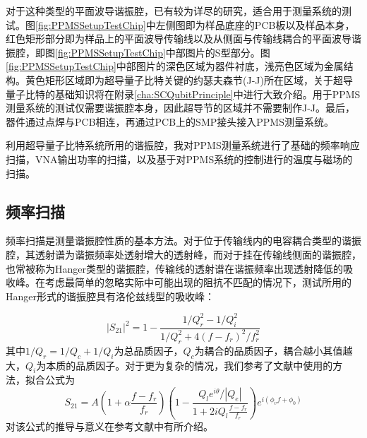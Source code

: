                   对于这种类型的平面波导谐振腔，已有较为详尽的研究\cite{Day2003,Wallraff2004Nature,schuster2007circuit,Gao2008Thesis,Barends2010APL,Geerlings2013}，适合用于测量系统的测试。图\ref{fig:PPMSSetupTestChip}中左侧图即为样品底座的PCB板以及样品本身，红色矩形部分即为样品上的平面波导传输线以及从侧面与传输线耦合的平面波导谐振腔，即图\ref{fig:PPMSSetupTestChip}中部图片的S型部分。图\ref{fig:PPMSSetupTestChip}中部图片的深色区域为器件衬底，浅亮色区域为金属结构。黄色矩形区域即为超导量子比特关键的约瑟夫森节(J-J)所在区域，关于超导量子比特的基础知识将在附录\ref{cha:SCQubitPrinciple}中进行大致介绍。用于PPMS测量系统的测试仅需要谐振腔本身，因此超导节的区域并不需要制作J-J。最后，器件通过点焊与PCB相连，再通过PCB上的SMP接头接入PPMS测量系统。

                  利用超导量子比特系统所用的谐振腔，我对PPMS测量系统进行了基础的频率响应扫描，VNA输出功率的扫描，以及基于对PPMS系统的控制进行的温度与磁场的扫描。




                  \subsection{频率扫描} %
                  \label{sub:频率扫描}

                  频率扫描是测量谐振腔性质的基本方法。对于位于传输线内的电容耦合类型的谐振腔，其透射谱为谐振频率处透射增大的透射峰\cite{Wallraff2004Nature,schuster2007circuit}，而对于挂在传输线侧面的谐振腔，也常被称为Hanger类型的谐振腔，传输线的透射谱在谐振频率出现透射降低的吸收峰\cite{Day2003,Gao2008Thesis,Geerlings2013}。在考虑最简单的忽略实际中可能出现的阻抗不匹配的情况下，测试所用的Hanger形式的谐振腔具有洛伦兹线型的吸收峰：

                  \begin{equation}
                  \label{eqn:simpleLorentzian}
                        |S_{21}|^2 = 1 - \frac{1/Q_r^2 - 1/Q_i^2}{1/Q_r^2 + 4 (f - f_r)^2/f_r^2} 
                  \end{equation}
                  其中$1/Q_r = 1/Q_c + 1/Q_i$为总品质因子，$Q_c$为耦合的品质因子，耦合越小其值越大，$Q_i$为本质的品质因子。对于更为复杂的情况，我们参考了文献中使用的方法，拟合公式为\cite{Bruno2015}
                  \begin{equation}
                        \label{eqn:complexFitFunction}
                        S_{21} = A \left ( 1+ \alpha \frac{f-f_r}{f_r} \right ) \left (1- \frac{Q_l e^{i \theta}/|Q_e| }{1 + 2i Q_l \frac{f-f_r}{f_r} } \right )e^{i ( \phi_v f + \phi_0 ) }
                  \end{equation}
                  对该公式的推导与意义在参考文献中有所介绍。
                  

